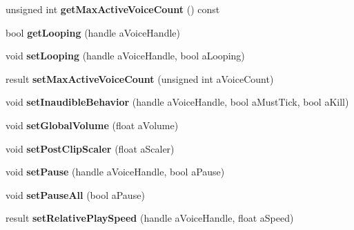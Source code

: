 \begin{DoxyCompactItemize}
unsigned int {\bfseries get\+Max\+Active\+Voice\+Count} () const
\item 
\mbox{\label{class_so_loud_1_1_soloud_a0d28a9886c1d1dc7389ad12fe893d8ed}} 
bool {\bfseries get\+Looping} (handle a\+Voice\+Handle)
\item 
\mbox{\label{class_so_loud_1_1_soloud_aabf12bbd4289f96ca0b80ab5f36561d1}} 
void {\bfseries set\+Looping} (handle a\+Voice\+Handle, bool a\+Looping)
\item 
\mbox{\label{class_so_loud_1_1_soloud_ad8249efec6260ec8fabdce1202255cca}} 
result {\bfseries set\+Max\+Active\+Voice\+Count} (unsigned int a\+Voice\+Count)
\item 
\mbox{\label{class_so_loud_1_1_soloud_a637327d28bfba8c649cd1055b1b589b1}} 
void {\bfseries set\+Inaudible\+Behavior} (handle a\+Voice\+Handle, bool a\+Must\+Tick, bool a\+Kill)
\item 
\mbox{\label{class_so_loud_1_1_soloud_a685ac512e992520cd939460308ef90f9}} 
void {\bfseries set\+Global\+Volume} (float a\+Volume)
\item 
\mbox{\label{class_so_loud_1_1_soloud_a66ddc86d64a1a1afe0e3ee729f03137e}} 
void {\bfseries set\+Post\+Clip\+Scaler} (float a\+Scaler)
\item 
\mbox{\label{class_so_loud_1_1_soloud_a950ec356b2fabceaa35b8a7eb03cf4d3}} 
void {\bfseries set\+Pause} (handle a\+Voice\+Handle, bool a\+Pause)
\item 
\mbox{\label{class_so_loud_1_1_soloud_a6e88cde01e539557fcfe3afbe9d9ef09}} 
void {\bfseries set\+Pause\+All} (bool a\+Pause)
\item 
\mbox{\label{class_so_loud_1_1_soloud_a45ac9d70d52266fb60651b0f4642d7cb}} 
result {\bfseries set\+Relative\+Play\+Speed} (handle a\+Voice\+Handle, float a\+Speed)
\item 
\mbox{\label{class_so_loud_1_1_soloud_affa0f7f149a859bca79deb55b0c66e5c}} 

\end{DoxyCompactItemize}
